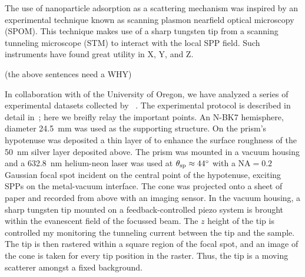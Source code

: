 The use of nanoparticle adsorption as a scattering mechanism was inspired
by an experimental technique known as scanning plasmon nearfield optical
microscopy (SPOM).  This technique makes use of a sharp tungsten tip from a
scanning tunneling microscope (STM) to interact with the local SPP field.
Such instruments have found great utility in X, Y, and Z.

(the above sentences need a WHY)

In collaboration with  of the University of Oregon, we have
analyzed a series of experimental datasets collected by
~\cite{schumann2009surface}.  The experimental protocol is
described in detail in~\cite{schumann2009surface}; here we breifly relay
the important points.  An N-BK7 hemisphere, diameter
\SI{24.5}{\milli\meter} was used as the supporting structure.  On the
prism's hypotenuse was deposited a thin layer of  to enhance the
surface roughness of the \SI{50}{\nano\meter} silver layer deposited above.
The prism was mounted in a vacuum housing and a \SI{632.8}{\nano\meter}
helium-neon laser was used at $\theta_\mathrm{sp}\approx\SI{44}{\degree}$ with a
$\mathrm{NA}=0.2$ Gaussian focal spot incident on the central point of the
hypotenuse, exciting SPPs on the metal-vacuum interface.  The cone was
projected onto a sheet of paper and recorded from above with an imaging
sensor.  In the vacuum housing, a sharp tungsten tip mounted on a
feedback-controlled piezo system is brought within the evanescent field of
the focussed beam.  The $z$ height of the tip is controlled my monitoring
the tunneling current between the tip and the sample.  The tip is then
rastered within a square region of the focal spot, and an image of the cone
is taken for every tip position in the raster.  Thus, the tip is a moving
scatterer amongst a fixed background.

